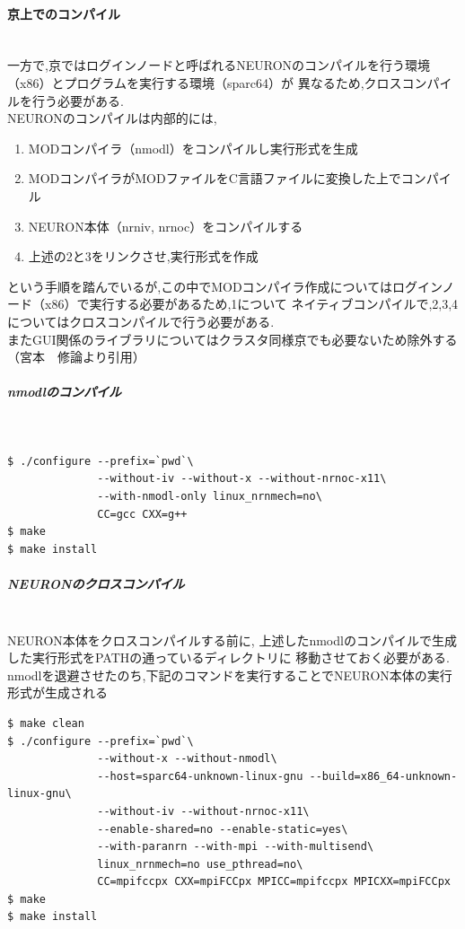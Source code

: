 \paragraph{京上でのコンパイル}~\\
一方で,京ではログインノードと呼ばれるNEURONのコンパイルを行う環境（x86）とプログラムを実行する環境（sparc64）が
異なるため,クロスコンパイルを行う必要がある.\\
NEURONのコンパイルは内部的には,
\begin{enumerate}
\item MODコンパイラ（nmodl）をコンパイルし実行形式を生成
\item MODコンパイラがMODファイルをC言語ファイルに変換した上でコンパイル
\item NEURON本体（nrniv, nrnoc）をコンパイルする
\item 上述の2と3をリンクさせ,実行形式を作成
\end{enumerate}
という手順を踏んでいるが,この中でMODコンパイラ作成についてはログインノード（x86）で実行する必要があるため,1について
ネイティブコンパイルで,2,3,4についてはクロスコンパイルで行う必要がある.\\
またGUI関係のライブラリについてはクラスタ同様京でも必要ないため除外する（宮本　修論より引用）\\
\subparagraph{nmodlのコンパイル}~\\
{\footnotesize
\begin{lstlisting}[caption=京でのnmodlのコンパイル,label=k-nmodl-compile,numbers=none]
$ ./configure --prefix=`pwd`\
              --without-iv --without-x --without-nrnoc-x11\
              --with-nmodl-only linux_nrnmech=no\
              CC=gcc CXX=g++
$ make
$ make install
\end{lstlisting}
}
\subparagraph{NEURONのクロスコンパイル}~\\
NEURON本体をクロスコンパイルする前に, 上述したnmodlのコンパイルで生成した実行形式をPATHの通っているディレクトリに
移動させておく必要がある. nmodlを退避させたのち,下記のコマンドを実行することでNEURON本体の実行形式が生成される
{\footnotesize
\begin{lstlisting}[caption=京でのNEURON本体のコンパイル,label=k-neuron-compile,numbers=none]
$ make clean
$ ./configure --prefix=`pwd`\
              --without-x --without-nmodl\
              --host=sparc64-unknown-linux-gnu --build=x86_64-unknown-linux-gnu\
              --without-iv --without-nrnoc-x11\
              --enable-shared=no --enable-static=yes\
              --with-paranrn --with-mpi --with-multisend\
              linux_nrnmech=no use_pthread=no\
              CC=mpifccpx CXX=mpiFCCpx MPICC=mpifccpx MPICXX=mpiFCCpx
$ make
$ make install
\end{lstlisting}
}

